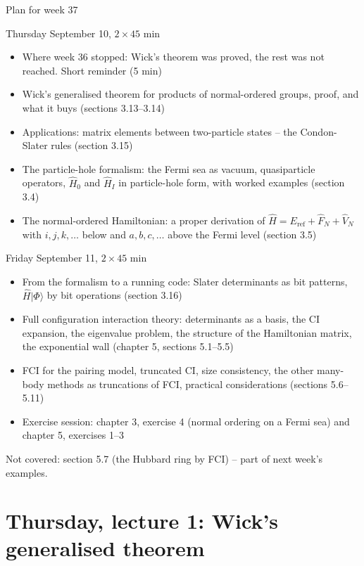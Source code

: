 \documentclass[aspectratio=169,10pt]{beamer}
\newcommand{\ket}[1]{\vert #1\rangle}
\begin{document}
\begin{frame}{Plan for week 37}
  \scriptsize
  \begin{block}{Thursday September 10, $2\times45$ min}
    \begin{itemize}
      \item Where week 36 stopped: Wick's theorem was proved, the rest was not reached. Short reminder (5 min)
      \item Wick's generalised theorem for products of normal-ordered groups, proof, and what it buys (sections 3.13--3.14)
      \item Applications: matrix elements between two-particle states -- the Condon-Slater rules (section 3.15)
      \item The particle-hole formalism: the Fermi sea as vacuum, quasiparticle operators, $\hat{H}_0$ and $\hat{H}_I$ in particle-hole form, with worked examples (section 3.4)
      \item The normal-ordered Hamiltonian: a proper derivation of $\hat{H}=E_{\mathrm{ref}}+\hat{F}_N+\hat{V}_N$ with $i,j,k,\dots$ below and $a,b,c,\dots$ above the Fermi level (section 3.5)
    \end{itemize}
  \end{block}
  \begin{block}{Friday September 11, $2\times45$ min}
    \begin{itemize}
      \item From the formalism to a running code: Slater determinants as bit patterns, $\hat{H}\ket{\Phi}$ by bit operations (section 3.16)
      \item Full configuration interaction theory: determinants as a basis, the CI expansion, the eigenvalue problem, the structure of the Hamiltonian matrix, the exponential wall (chapter 5, sections 5.1--5.5)
      \item FCI for the pairing model, truncated CI, size consistency, the other many-body methods as truncations of FCI, practical considerations (sections 5.6--5.11)
      \item Exercise session: chapter 3, exercise 4 (normal ordering on a Fermi sea) and chapter 5, exercises 1--3
    \end{itemize}
  \end{block}
  Not covered: section 5.7 (the Hubbard ring by FCI) -- part of next week's examples.
\end{frame}

\section{Thursday, lecture 1: Wick's generalised theorem}
\end{document}
